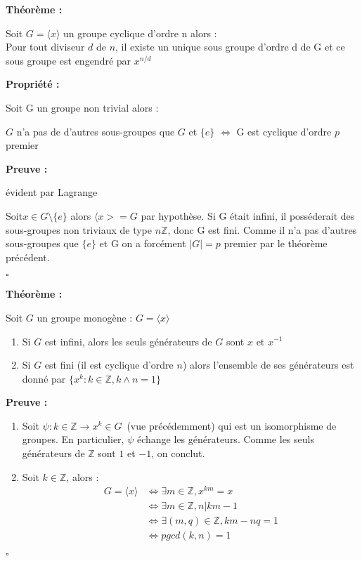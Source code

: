 \documentclass{report}
\renewenvironment{leftbar}{%
  \def\FrameCommand{\vrule width 0.4pt \hspace{10pt}}%
  \MakeFramed {\advance\hsize-\width \FrameRestore}}%
 {\endMakeFramed}%
\newenvironment{preuve}{\vspace*{0.5cm}
    \begin{leftbar}
    \noindent\textbf{Preuve :}\par}{
    \begin{flushright}
    $\square$
    \end{flushright}
    \end{leftbar}
}
\newenvironment{prop}{\begin{tcolorbox}[colframe= white]
    \textbf{Propriété :}
     \par}
    {\end{tcolorbox}}
\newenvironment{theoreme}[1][]{
    \begin{tcolorbox}[]
    \textbf{Théorème :} #1  \par} 
    {\end{tcolorbox}}
\newcommand{\Z}{\mathbb{Z}}
\begin{document}
\begin{theoreme}
Soit $G = \langle x \rangle$ un groupe cyclique d'ordre n alors :\\
Pour tout diviseur $d$ de $n$, il existe un unique sous groupe d'ordre d de G et ce sous groupe est engendré par $x^{n/d}$
\end{theoreme}

\begin{prop}

Soit G un groupe non trivial alors :

\begin{center}
$G$ n'a pas de d'autres sous-groupes que $G$ et $\{ e \}$ $\Longleftrightarrow  $ G est cyclique d'ordre $p$ premier
\end{center} 
\end{prop}

\begin{preuve}
\fbox{$\Leftarrow$} évident par Lagrange


\noindent \fbox{$\Rightarrow$} Soit$x \in G\setminus\{e\}$ alors $\langle x>=G$ par hypothèse. Si G était infini, il posséderait des sous-groupes non triviaux de type $n\Z$, donc G est fini. Comme il n'a pas d'autres sous-groupes que $\{ e\}$ et G on a forcément $|G|=p$ premier par le théorème précédent.
\end{preuve}

\begin{theoreme}
	Soit $G$ un groupe monogène : $G=\langle x \rangle$
	\begin{enumerate}
		\item Si $G$ est infini, alors les seuls générateurs de $G$ sont $x$ et $x^{-1}$ 
		\item Si $G$ est fini (il est cyclique d'ordre $n$) alors l'ensemble de ses générateurs est donné par $\{x^k : k\in \mathbb{Z}, k \wedge n =1\}$
	\end{enumerate}
\end{theoreme}

\begin{preuve}
	\begin{enumerate}
	\item	Soit $\psi : k \in \mathbb{Z} \to x^k \in G \,$ (vue précédemment) qui est un isomorphisme de groupes. En particulier, $\psi$ échange les générateurs. Comme les seuls générateurs de $\mathbb{Z}$ sont $1$ et $-1$, on conclut. 
	\item	Soit $k \in \mathbb{Z}$, alors : 
		\begin{equation*} 
		\begin{split}
			G=\langle x \rangle  &  \iff \exists m \in \mathbb{Z}, x^{km}=x \\
 			& \iff \exists m \in \mathbb{Z}, n | km-1 \\
			&  \iff \exists (m,q)\in \mathbb{Z}, km-nq=1 \\
			& \iff pgcd(k,n)=1
		\end{split}
\end{equation*}
	
	\end{enumerate}
	

\end{preuve}
\end{document}
